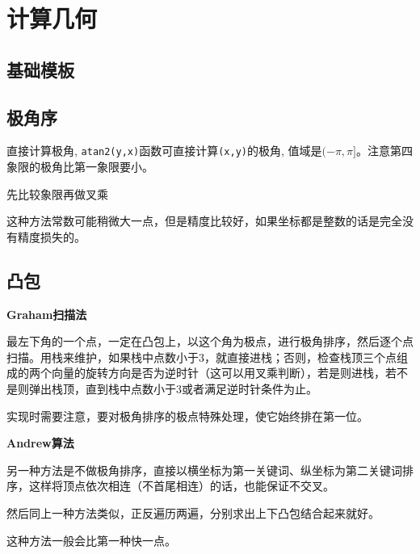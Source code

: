 \section{计算几何}

\subsection{基础模板}


\subsection{极角序}

直接计算极角, \verb|atan2(y,x)|函数可直接计算\verb|(x,y)|的极角, 值域是$(-\pi,\pi]$。注意第四象限的极角比第一象限要小。


先比较象限再做叉乘

这种方法常数可能稍微大一点，但是精度比较好，如果坐标都是整数的话是完全没有精度损失的。

\subsection{凸包}

\textbf{Graham扫描法}


最左下角的一个点，一定在凸包上，以这个角为极点，进行极角排序，然后逐个点扫描。用栈来维护，如果栈中点数小于3，就直接进栈；否则，检查栈顶三个点组成的两个向量的旋转方向是否为逆时针（这可以用叉乘判断），若是则进栈，若不是则弹出栈顶，直到栈中点数小于3或者满足逆时针条件为止。

实现时需要注意，要对极角排序的极点特殊处理，使它始终排在第一位。


\textbf{Andrew算法}


另一种方法是不做极角排序，直接以横坐标为第一关键词、纵坐标为第二关键词排序，这样将顶点依次相连（不首尾相连）的话，也能保证不交叉。

然后同上一种方法类似，正反遍历两遍，分别求出上下凸包结合起来就好。

这种方法一般会比第一种快一点。